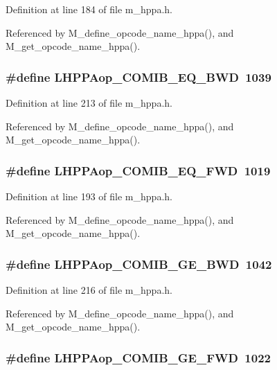 Definition at line 184 of file m\_\-hppa.h.

Referenced by M\_\-define\_\-opcode\_\-name\_\-hppa(), and M\_\-get\_\-opcode\_\-name\_\-hppa().
\subsubsection{\setlength{\rightskip}{0pt plus 5cm}\#define LHPPAop\_\-COMIB\_\-EQ\_\-BWD~1039}\label{m__hppa_8h_fede920dd8d4abef578e9fc2f7855fb4}




Definition at line 213 of file m\_\-hppa.h.

Referenced by M\_\-define\_\-opcode\_\-name\_\-hppa(), and M\_\-get\_\-opcode\_\-name\_\-hppa().
\subsubsection{\setlength{\rightskip}{0pt plus 5cm}\#define LHPPAop\_\-COMIB\_\-EQ\_\-FWD~1019}\label{m__hppa_8h_03dca7fda286637b42a6dce036fb3370}




Definition at line 193 of file m\_\-hppa.h.

Referenced by M\_\-define\_\-opcode\_\-name\_\-hppa(), and M\_\-get\_\-opcode\_\-name\_\-hppa().
\subsubsection{\setlength{\rightskip}{0pt plus 5cm}\#define LHPPAop\_\-COMIB\_\-GE\_\-BWD~1042}\label{m__hppa_8h_af59e0c859db9c4dfa4b7b10adb62918}




Definition at line 216 of file m\_\-hppa.h.

Referenced by M\_\-define\_\-opcode\_\-name\_\-hppa(), and M\_\-get\_\-opcode\_\-name\_\-hppa().
\subsubsection{\setlength{\rightskip}{0pt plus 5cm}\#define LHPPAop\_\-COMIB\_\-GE\_\-FWD~1022}\label{m__hppa_8h_dcff9ddc62f396dec397501d38457976}




